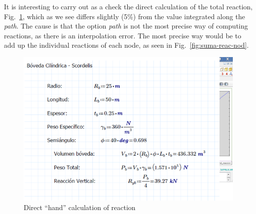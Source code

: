 \documentclass[english,a4paper,12pt]{article}
\begin{document}
It is interesting to carry out as a check the direct calculation of the total reaction, Fig.~\ref{fig:calc-anal-reac}, which as we see differs slightly (5\%) from the value integrated along the \emph{path}.
The cause is that the option \emph{path} is not the most precise way of computing reactions, as there is an interpolation error.
The most precise way would be to add up the individual reactions of each node, as seen in Fig.~\ref{fig:suma-reac-nod}.
\begin{figure}[!htbp]
\centering
\includegraphics{fm/Fig-5_Analitico_Reacc_Vertical}
\caption{Direct ``hand'' calculation of reaction}
\label{fig:calc-anal-reac}
\end{figure}
\end{document}
